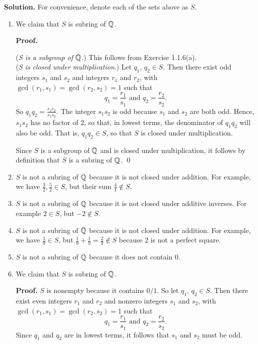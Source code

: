 \begin{enumerate}
      \textbf{Solution.} For convenience, denote each of the sets above as $S$.

      \begin{enumerate}
         \item We claim that $S$ is subring of $\mathbb{Q}$.

               \textbf{Proof.}

               (\textit{S is a subgroup of $\mathbb{Q}$}.) This follows from Exercise
               1.1.6(a). \\

               (\textit{S is closed under multiplication}.) Let $q_1$,
               $q_2 \in S$. Then there exist odd integers $s_1$ and $s_2$ and 
               integers $r_1$ and $r_2$, with
               $\gcd(r_1, s_1) = \gcd(r_2, s_2) = 1$ such that
               $$q_1 = \frac{r_1}{s_1} \text{ and } q_2 = \frac{r_2}{s_2}.$$
               So $q_1q_2 = \frac{r_1r_2}{s_1s_2}$. The integer $s_1s_2$ is odd
               because $s_1$ and $s_2$ are both odd. Hence, $s_1s_2$ has no
               factor of 2, so that, in lowest terms, the denominator of
               $q_1q_2$ will also be odd. That is, $q_1q_2 \in S$, so that $S$
               is closed under multiplication.
            
               Since $S$ is a subgroup of $\mathbb{Q}$ and is closed under
               multiplication, it follows by definition that $S$ is a subring of 
               $\mathbb{Q}$. \qed
         \item $S$ is not a subring of $\mathbb{Q}$ because it is not closed under
               addition. For example, we have $\frac{3}{2}, \frac{5}{2} \in S$,
               but their sum $\frac{4}{1} \notin S$.
         \item $S$ is not a subring of $\mathbb{Q}$ because it is not closed under
               additive inverses. For example $2 \in S$, but $-2 \notin S$.
         \item $S$ is not a subring of $\mathbb{Q}$ because it is not closed under
               addition. For example, we have $\frac{1}{9} \in S$, but
               $\frac{1}{9} + \frac{1}{9} = \frac{2}{9} \notin S$ because 2 is
               not a perfect square.
         \item $S$ is not a subring of $\mathbb{Q}$ because it does not contain 0.
         \item We claim that $S$ is subring of $\mathbb{Q}$.

               \textbf{Proof.} $S$ is nonempty because it contains $0/1$. So let
               $q_1$, $q_2 \in S$. Then there exist even integers $r_1$ and
               $r_2$ and nonzero integers $s_1$ and $s_2$, with
               $\gcd(r_1, s_1) = \gcd(r_2, s_2) = 1$ such that
               $$q_1 = \frac{r_1}{s_1} \text{ and } q_2 = \frac{r_2}{s_2}.$$
               Since $q_1$ and $q_2$ are in lowest terms, it follows that $s_1$
               and $s_2$ must be odd. 


\end{enumerate}
\end{enumerate}

